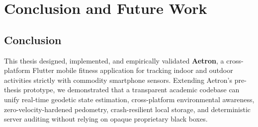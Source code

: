 \chapter{Conclusion and Future Work}
\label{ch:conclusion}

\section{Conclusion}
This thesis designed, implemented, and empirically validated \textbf{Aetron}, a cross-platform Flutter mobile fitness application for tracking indoor and outdoor activities strictly with commodity smartphone sensors. Extending Aetron's pre-thesis prototype, we demonstrated that a transparent academic codebase can unify real-time geodetic state estimation, cross-platform environmental awareness, zero-velocity-hardened pedometry, crash-resilient local storage, and deterministic server auditing without relying on opaque proprietary black boxes.

